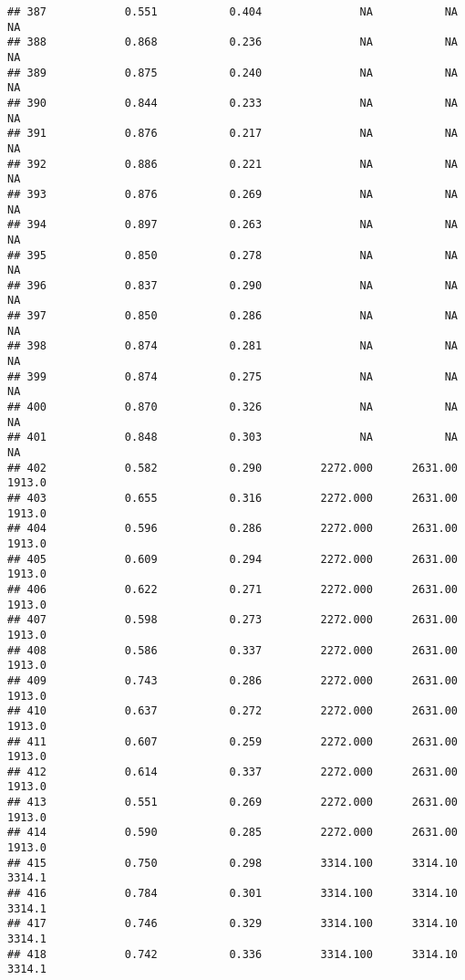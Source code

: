 \documentclass[
]{article}
\begin{document}
\begin{verbatim}
## 387            0.551           0.404               NA           NA           NA
## 388            0.868           0.236               NA           NA           NA
## 389            0.875           0.240               NA           NA           NA
## 390            0.844           0.233               NA           NA           NA
## 391            0.876           0.217               NA           NA           NA
## 392            0.886           0.221               NA           NA           NA
## 393            0.876           0.269               NA           NA           NA
## 394            0.897           0.263               NA           NA           NA
## 395            0.850           0.278               NA           NA           NA
## 396            0.837           0.290               NA           NA           NA
## 397            0.850           0.286               NA           NA           NA
## 398            0.874           0.281               NA           NA           NA
## 399            0.874           0.275               NA           NA           NA
## 400            0.870           0.326               NA           NA           NA
## 401            0.848           0.303               NA           NA           NA
## 402            0.582           0.290         2272.000      2631.00       1913.0
## 403            0.655           0.316         2272.000      2631.00       1913.0
## 404            0.596           0.286         2272.000      2631.00       1913.0
## 405            0.609           0.294         2272.000      2631.00       1913.0
## 406            0.622           0.271         2272.000      2631.00       1913.0
## 407            0.598           0.273         2272.000      2631.00       1913.0
## 408            0.586           0.337         2272.000      2631.00       1913.0
## 409            0.743           0.286         2272.000      2631.00       1913.0
## 410            0.637           0.272         2272.000      2631.00       1913.0
## 411            0.607           0.259         2272.000      2631.00       1913.0
## 412            0.614           0.337         2272.000      2631.00       1913.0
## 413            0.551           0.269         2272.000      2631.00       1913.0
## 414            0.590           0.285         2272.000      2631.00       1913.0
## 415            0.750           0.298         3314.100      3314.10       3314.1
## 416            0.784           0.301         3314.100      3314.10       3314.1
## 417            0.746           0.329         3314.100      3314.10       3314.1
## 418            0.742           0.336         3314.100      3314.10       3314.1

\end{verbatim}
\end{document}
